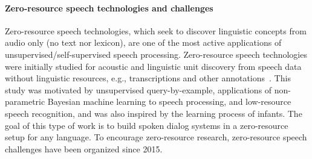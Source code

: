 
\paragraph{Zero-resource speech technologies and challenges}
\label{zero_speech}
Zero-resource speech technologies, which seek to discover linguistic concepts
from audio only (no text nor lexicon), are one of the most active applications
of unsupervised/self-supervised speech processing.
Zero-resource speech technologies were initially studied for acoustic and
linguistic unit discovery from speech data without linguistic resources,
e.g., transcriptions and other annotations~\parencite{jansen_summary_2013}.
This study was motivated by unsupervised query-by-example, applications of
non-parametric Bayesian machine learning to speech processing, and low-resource
speech recognition, and was also inspired by the learning process of infants.
The goal of this type of work is to build spoken dialog systems in a zero-resource
setup for any language.
  To encourage      zero-resource research,                  %
zero-resource speech challenges have been organized since 2015.

